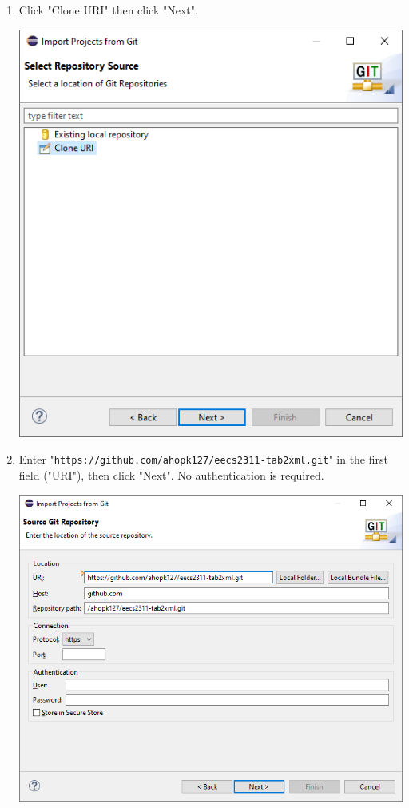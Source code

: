 \documentclass[11pt]{article}
\begin{document}
\begin{enumerate}
\begin{center}
\end{center}
\item Click "Clone URI" then click "Next".
\begin{center}
\includegraphics[width=.9\linewidth]{./screenshot-eclipse-install-3.png}
\end{center}
\item Enter "\texttt{https://github.com/ahopk127/eecs2311-tab2xml.git}" in the first field ("URI"), then click "Next".  No authentication is required.
\begin{center}
\includegraphics[width=.9\linewidth]{./screenshot-eclipse-install-4.png}

\end{center}
\end{enumerate}
\end{document}
